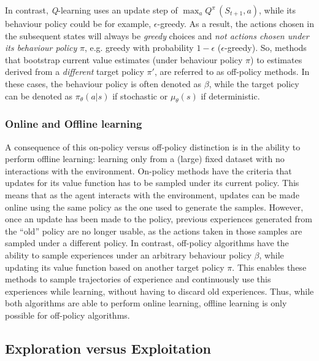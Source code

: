 In contrast, \textit{Q}-learning uses an update step of $\max_a Q^\pi\,(S_{t+1}, a)$, while its behaviour policy could be for example, $\epsilon$-greedy. As a result, the actions chosen in the subsequent states will always be \textit{greedy} choices and \textit{not actions chosen under its behaviour policy} $\pi$, e.g. greedy with probability $1-\epsilon$ ($\epsilon$-greedy).
So, methods that bootstrap current value estimates (under behaviour policy $\pi$) to estimates derived from a \textit{different} target policy $\pi'$, are referred to as off-policy methods. In these cases, the behaviour policy is often denoted as $\beta$, while the target policy can be denoted as $\pi_\theta(a|s)$ if stochastic or $\mu_\theta(s)$ if deterministic.

\subsubsection{Online and Offline learning}
A consequence of this on-policy versus off-policy distinction is in the ability to perform offline learning: learning only from a (large) fixed dataset with no interactions with the environment. On-policy methods have the criteria that updates for its value function has to be sampled under its current policy. This means that as the agent interacts with the environment, updates can be made online using the same policy as the one used to generate the samples. However, once an update has been made to the policy, previous experiences generated from the ``old'' policy are no longer usable, as the actions taken in those samples are sampled under a different policy. In contrast, off-policy algorithms have the ability to sample experiences under an arbitrary behaviour policy $\beta$, while updating its value function based on another target policy $\pi$. This enables these methods to sample trajectories of experience and continuously use this experiences while learning, without having to discard old experiences. Thus, while both algorithms are able to perform online learning, offline learning is only possible for off-policy algorithms.

\subsection{Exploration versus Exploitation}

